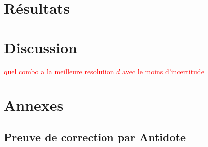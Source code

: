 \documentclass[conference]{IEEEtran}
\begin{document}

\section{Résultats \label{resultats}}



\section{Discussion}

\textcolor{red}{quel combo a la meilleure resolution $d$ avec le moins d'incertitude}


\clearpage

\section{Annexes}

\subsection{Preuve de correction par Antidote}

\clearpage
\end{document}
